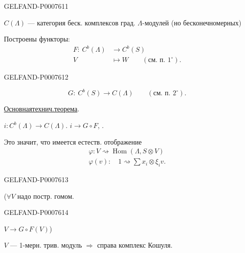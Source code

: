\begin{GelfandAdjacentEvidence}{GELFAND-P000761}{1}

\(C(\Lambda)\) --- категория беск. комплексов град. \(\Lambda\)-модулей
(но бесконечномерных)

Построены функторы:
\begin{align*}
F:\ C^b(\Lambda)&\longrightarrow C^b(S)\\
V&\longmapsto W\qquad(\text{см. п. }1^\circ).
\end{align*}
\end{GelfandAdjacentEvidence}
\begin{GelfandAdjacentEvidence}{GELFAND-P000761}{2}

\[
G:\ C^b(S)\longrightarrow C(\Lambda)\qquad(\text{см. п. }2^\circ).
\]

\underline{Основная}\quad\underline{технич.}\quad\underline{теорема}.

\(i:C^b(\Lambda)\longrightarrow C(\Lambda)\).
\(i\longrightarrow G\circ F\),
.

Это значит, что имеется естеств. отображение
\begin{gather*}
\varphi: V\rightsquigarrow\operatorname{Hom}(\Lambda,S\otimes V)\\
\varphi(v):\quad 1\rightsquigarrow\sum x_i\otimes\xi_i v.
\end{gather*}
\end{GelfandAdjacentEvidence}
\begin{GelfandAdjacentEvidence}{GELFAND-P000761}{3}


(\(\forall V\) надо постр. гомом.
\end{GelfandAdjacentEvidence}
\begin{GelfandAdjacentEvidence}{GELFAND-P000761}{4}

\(V\longrightarrow G\circ F(V)\))

\(V\) --- 1-мерн. трив. модуль \(\Rightarrow\) справа комплекс Кошуля.

\end{GelfandAdjacentEvidence}
